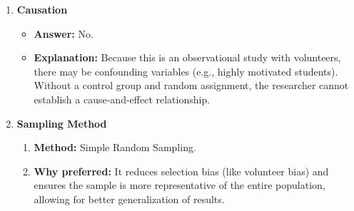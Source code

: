 {\begin{enumerate}[label=(\alph*)]
    \item \textbf{Causation}
    \begin{itemize}
        \item \textbf{Answer:} No.
        \item \textbf{Explanation:} Because this is an observational study with volunteers, there may be confounding variables (e.g., highly motivated students). Without a control group and random assignment, the researcher cannot establish a cause-and-effect relationship.
    \end{itemize}

    \item \textbf{Sampling Method}
    \begin{enumerate}[label=\roman*.]
        \item \textbf{Method:} Simple Random Sampling.
        \item \textbf{Why preferred:} It reduces selection bias (like volunteer bias) and ensures the sample is more representative of the entire population, allowing for better generalization of results.
    \end{enumerate}
\end{enumerate}
}
